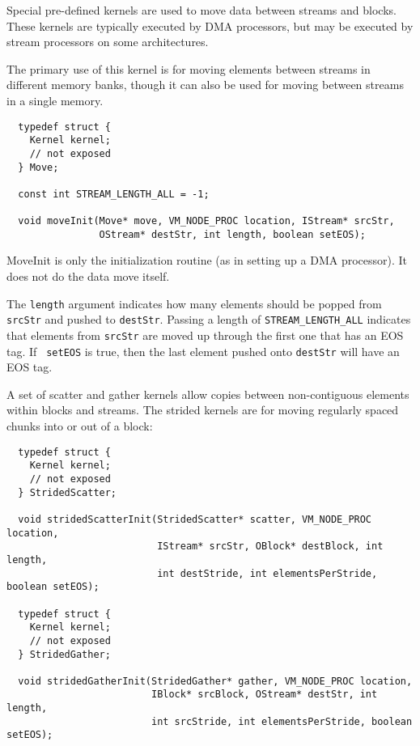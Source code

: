 Special pre-defined kernels are used to move data between streams and
blocks. These kernels are typically executed by DMA processors, but
may be executed by stream processors on some architectures.

 The primary use of this kernel is for moving elements
between streams in different memory banks, though it can also be used
for moving between streams in a single memory.

{\small \begin{verbatim}
  typedef struct {
    Kernel kernel;
    // not exposed
  } Move;
  
  const int STREAM_LENGTH_ALL = -1;
  
  void moveInit(Move* move, VM_NODE_PROC location, IStream* srcStr, 
                OStream* destStr, int length, boolean setEOS);
\end{verbatim}}

MoveInit is only the initialization routine (as in setting up a DMA
processor).  It does not do the data move itself.

The {\tt length} argument indicates how many elements should be popped
from {\tt srcStr} and pushed to {\tt destStr}. Passing a length of
{\tt STREAM\_LENGTH\_ALL} indicates that elements from {\tt srcStr}
are moved up through the first one that has an EOS tag.  If {\tt
setEOS} is true, then the last element pushed onto {\tt destStr} will
have an EOS tag.

 A set of scatter and gather kernels allow copies
between non-contiguous elements within blocks and streams.  The
strided kernels are for moving regularly spaced chunks into or out of
a block:
{\small \begin{verbatim}
  typedef struct {
    Kernel kernel;
    // not exposed
  } StridedScatter;
  
  void stridedScatterInit(StridedScatter* scatter, VM_NODE_PROC location, 
                          IStream* srcStr, OBlock* destBlock, int length,
                          int destStride, int elementsPerStride, boolean setEOS);

  typedef struct {
    Kernel kernel;
    // not exposed
  } StridedGather;
  
  void stridedGatherInit(StridedGather* gather, VM_NODE_PROC location, 
                         IBlock* srcBlock, OStream* destStr, int length,
                         int srcStride, int elementsPerStride, boolean setEOS);
\end{verbatim}}

